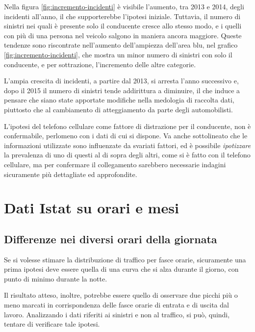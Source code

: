 \documentclass[a4paper,12pt]{report}
\newcommand{\quotestyle}[1]{\textit{#1}}
\begin{document}
Nella figura \ref{fig:incremento-incidenti} è visibile l'aumento, tra 2013 e 2014, degli 
incidenti all'anno, il che supporterebbe l'ipotesi iniziale. 
Tuttavia, il numero di sinistri nei quali è presente solo il conducente 
cresce allo stesso modo, e i quelli con più di una persona nel veicolo 
salgono in maniera ancora maggiore. 
Queste tendenze sono riscontrate nell'aumento dell'ampiezza dell'area blu, nel grafico 
\ref{fig:incremento-incidenti}, che mostra un minor numero di sinistri con solo il conducente, 
e per sottrazione, l'incremento delle altre categorie. 

L'ampia crescita di incidenti, a partire dal 2013, si arresta l'anno successivo e, 
dopo il 2015 il numero di sinistri tende addirittura a diminuire, 
il che induce a pensare che siano state apportate modifiche nella medologia 
di raccolta dati, piuttosto che al cambiamento di atteggiamento da parte degli automobilisti.

L'ipotesi del telefono cellulare come fattore di distrazione per il conducente, 
non è confermabile, perlomeno con i dati di cui si dispone. 
Va anche sottolineato che le informazioni utilizzate sono influenzate da svariati fattori, ed è 
possibile \quotestyle{ipotizzare} la prevalenza di uno di questi al di sopra degli altri, 
come si è fatto con il telefono cellulare, 
ma per confermare il collegamento sarebbero necessarie indagini sicuramente 
più dettagliate ed approfondite.

\section{Dati Istat su orari e mesi}

\subsection{Differenze nei diversi orari della giornata}

Se si volesse stimare la distribuzione di traffico per fasce orarie, 
sicuramente una prima ipotesi 
deve essere quella di una curva che si alza durante il giorno, con 
punto di minimo durante la notte. 

Il risultato atteso, inoltre, potrebbe essere 
quello di osservare due picchi più o meno marcati 
in corrispondenza delle fasce orarie di entrata e di uscita dal lavoro. 
Analizzando i dati riferiti ai sinistri e non al traffico, si può, 
quindi, tentare di verificare tale ipotesi.
\end{document}
